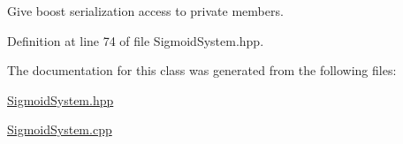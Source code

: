 Give boost serialization access to private members. 



Definition at line 74 of file Sigmoid\+System.\+hpp.



The documentation for this class was generated from the following files\+:\begin{DoxyCompactItemize}
\item 
\hyperlink{SigmoidSystem_8hpp}{Sigmoid\+System.\+hpp}\item 
\hyperlink{SigmoidSystem_8cpp}{Sigmoid\+System.\+cpp}\end{DoxyCompactItemize}
